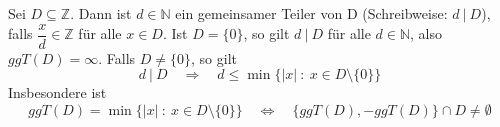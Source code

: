 \label{Bemerkung zu Teilern}
Sei $D \subseteq \mathbb{Z}$. Dann ist $d \in \mathbb{N}$ ein gemeinsamer Teiler von D (Schreibweise: $d \: \vert \: D$), falls $\dfrac{x}{d} \in \mathbb{Z}$ für alle $x \in D$. Ist $D = \lbrace 0 \rbrace$, so gilt $d \: \vert \: D$ für alle $d \in \mathbb{N}$, also $ggT(D)=\infty$. Falls $D \neq \lbrace 0 \rbrace$, so gilt
\begin{equation*}
d \: \vert \: D \quad \Rightarrow \quad d \leq \min \lbrace \vert x \vert \: : \: x \in D\setminus \lbrace 0 \rbrace \rbrace
\end{equation*}
Insbesondere ist
\begin{equation*}
ggT(D) = \min \lbrace \vert x \vert \: : \: x \in D\setminus \lbrace 0 \rbrace \rbrace \quad \Leftrightarrow \quad \lbrace ggT(D), -ggT(D) \rbrace \cap D \neq \emptyset 
\end{equation*}